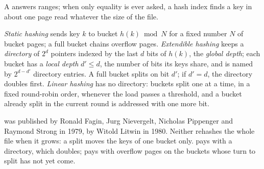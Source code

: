 A  answers ranges; when only equality is ever asked, a hash index finds a key in about one page read whatever the size of the file.

\begin{definition}\label{def:b3:database-storage:hashing}
\emph{Static hashing} sends key $k$ to bucket $h(k) \bmod N$ for a fixed number $N$ of bucket pages; a full bucket chains overflow pages. \emph{Extendible hashing} keeps a \emph{directory} of $2^d$ pointers indexed by the last $d$ bits of $h(k)$, the \emph{global depth}; each bucket has a \emph{local depth} $d' \le d$, the number of bits its keys share, and is named by $2^{d-d'}$ directory entries. A full bucket splits on bit $d'$; if $d' = d$, the directory doubles first. \emph{Linear hashing} has no directory: buckets split one at a time, in a fixed round-robin order, whenever the load passes a threshold, and a bucket already split in the current round is addressed with one more bit.
\end{definition}

 was published by Ronald Fagin, Jurg Nievergelt, Nicholas Pippenger and Raymond Strong in 1979,  by Witold Litwin in 1980. %
Neither rehashes the whole file when it grows: a split moves the keys of one bucket only.  pays with a directory, which doubles;  pays with overflow pages on the buckets whose turn to split has not yet come.

\label{lst:b3:database-storage:extendible}

